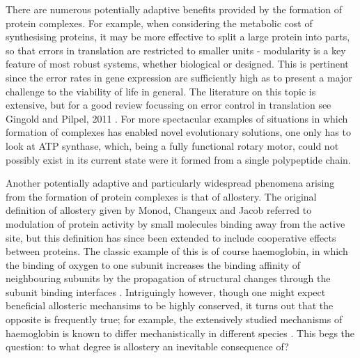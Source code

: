 \documentclass[a4paper,11pt,twoside,openright]{scrbook}
\begin{document}
There are numerous potentially adaptive benefits provided by the formation of protein complexes. For example, when considering the metabolic cost of synthesising proteins, it may be more effective to split a large protein into parts, so that errors in translation are restricted to smaller units - modularity is a key feature of most robust systems, whether biological or designed. This is pertinent since the error rates in gene expression are sufficiently high as to present a major challenge to the viability of life in general. The literature on this topic is extensive, but for a good review focussing on error control in translation see Gingold and Pilpel, 2011 \cite{Gingold2011}. For more spectacular examples of situations in which formation of complexes has enabled novel evolutionary solutions, one only has to look at ATP synthase, which, being a fully functional rotary motor, could not possibly exist in its current state were it formed from a single polypeptide chain.

Another potentially adaptive and particularly widespread phenomena arising from the formation of protein complexes is that of allostery. The original definition of allostery given by Monod, Changeux and Jacob \cite{Monod1963} referred to modulation of protein activity by small molecules binding away from the active site, but this definition has since been extended to include cooperative effects between proteins. The classic example of this is of course haemoglobin, in which the binding of oxygen to one subunit increases the binding affinity of neighbouring subunits by the propagation of structural changes through the subunit binding interfaces \cite{Perutz1976}. Intriguingly however, though one might expect beneficial allosteric mechansims to be highly conserved, it turns out that the opposite is frequently true; for example, the extensively studied mechanisms of haemoglobin is known to differ mechanistically in different species \cite{Royer2005,Bellelli2011}. This begs the question: to what degree is allostery an inevitable consequence of?
\end{document}
